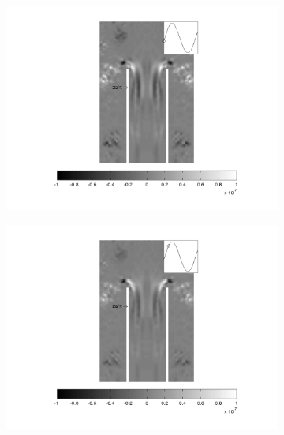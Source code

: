 \begin{landscape}
\newpage
\vfill
\begin{figure}[ht!]
\begin{subfigure}{0.55 \textwidth}
  \includegraphics[width=1.\linewidth]{figuras/min_ka_007_1.png}
  \caption[]{}
  \label{fig:min_007_1}
\end{subfigure}
\begin{subfigure}{0.55 \textwidth}
  \includegraphics[width=1.\linewidth]{figuras/min_ka_007_2.png}
  \caption[]{}
  \label{fig:min_007_2}
\end{subfigure}
\begin{subfigure}{0.55 \textwidth}

\end{subfigure}
\end{figure}
\end{landscape}
